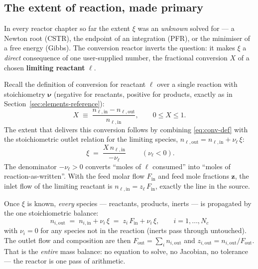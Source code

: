 \documentclass[11pt,a4paper]{article}
\newcommand{\zv}{\mathbf{z}}
\begin{document}
\subsection{The extent of reaction, made primary}

In every reactor chapter so far the extent $\xi$ was an \emph{unknown}
solved for --- a Newton root (CSTR), the endpoint of an integration
(PFR), or the minimiser of a free energy (Gibbs). The conversion
reactor inverts the question: it makes $\xi$ a \emph{direct} consequence
of one user-supplied number, the fractional conversion $X$ of a chosen
\textbf{limiting reactant} $\ell$.

Recall the definition of conversion for reactant $\ell$ over a single
reaction with stoichiometry $\boldsymbol\nu$ (negative for reactants,
positive for products, exactly as in
Section~\ref{sec:elements-reference}):
\begin{equation}
   X \;\equiv\; \frac{n_{\ell,\mathrm{in}} - n_{\ell,\mathrm{out}}}
                     {n_{\ell,\mathrm{in}}},
   \qquad 0 \le X \le 1 .
   \label{eq:conv-def}
\end{equation}
The extent that delivers this conversion follows by combining
\eqref{eq:conv-def} with the stoichiometric outlet relation for the
limiting species, $n_{\ell,\mathrm{out}} = n_{\ell,\mathrm{in}}
+ \nu_\ell\,\xi$:
\begin{equation}
   \boxed{\;
   \xi \;=\; \frac{X \, n_{\ell,\mathrm{in}}}{-\nu_\ell}
   \;}
   \qquad (\nu_\ell < 0).
   \label{eq:conv-extent}
\end{equation}
The denominator $-\nu_\ell > 0$ converts ``moles of $\ell$ consumed''
into ``moles of reaction-as-written''. With the feed molar flow
$F_{\mathrm{in}}$ and feed mole fractions $\zv$, the inlet flow of the
limiting reactant is $n_{\ell,\mathrm{in}} = z_\ell\,F_{\mathrm{in}}$,
exactly the line
 in the source.

Once $\xi$ is known, \emph{every} species --- reactants, products,
inerts --- is propagated by the one stoichiometric balance:
\begin{equation}
   \boxed{\;
   n_{i,\mathrm{out}} \;=\; n_{i,\mathrm{in}} + \nu_i\,\xi
   \;=\; z_i\,F_{\mathrm{in}} + \nu_i\,\xi,
   \qquad i = 1, \dots, N_c
   \;}
   \label{eq:conv-outlet}
\end{equation}
with $\nu_i = 0$ for any species not in the reaction (inerts pass
through untouched). The outlet flow and composition are then
$F_{\mathrm{out}} = \sum_i n_{i,\mathrm{out}}$ and
$z_{i,\mathrm{out}} = n_{i,\mathrm{out}}/F_{\mathrm{out}}$. That is the
\emph{entire} mass balance: no equation to solve, no Jacobian, no
tolerance --- the reactor is one pass of arithmetic.
\end{document}
